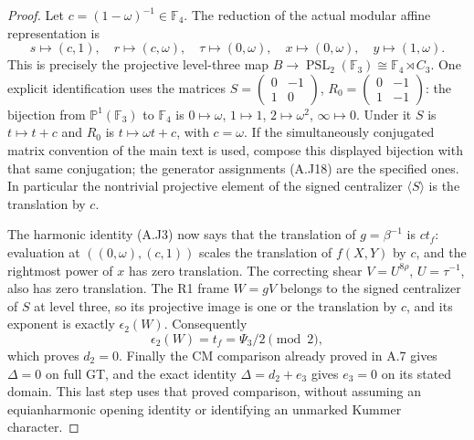 \begin{proof}
Let $c=(1-\omega)^{-1}\in\mathbb F_4$.  The reduction of
the actual modular affine representation is
\[
 s\mapsto(c,1),\quad r\mapsto(c,\omega),\quad
 \tau\mapsto(0,\omega),\quad
 x\mapsto(0,\omega),\quad y\mapsto(1,\omega).
 \tag{A.J18}
\]
This is precisely the projective level-three map
$B\to\operatorname{PSL}_2(\mathbb F_3)
\cong\mathbb F_4\rtimes C_3$.  One explicit identification
uses the matrices
$S=\left(\begin{smallmatrix}0&-1\\1&0\end{smallmatrix}\right)$,
$R_0=\left(\begin{smallmatrix}0&-1\\1&-1\end{smallmatrix}\right)$:
the bijection from $\mathbb P^1(\mathbb F_3)$ to $\mathbb F_4$
is $0\mapsto\omega$, $1\mapsto1$, $2\mapsto\omega^2$,
$\infty\mapsto0$.  Under it $S$ is $t\mapsto t+c$ and
$R_0$ is $t\mapsto\omega t+c$, with $c=\omega$.
If the simultaneously conjugated matrix convention of the
main text is used, compose this displayed bijection with that
same conjugation; the generator assignments (A.J18) are the
specified ones.  In particular the nontrivial projective
element of the signed centralizer $\langle S\rangle$ is the
translation by $c$.

The harmonic identity (A.J3) now says that the translation
of $g=\beta^{-1}$ is $ct_f$: evaluation at
$((0,\omega),(c,1))$ scales the translation of $f(X,Y)$ by
$c$, and the rightmost power of $x$ has zero translation.
The correcting shear $V=U^{8\rho}$, $U=\tau^{-1}$, also has
zero translation.  The R1 frame $W=gV$ belongs to the signed
centralizer of $S$ at level three, so its projective image is
one or the translation by $c$, and its exponent is exactly
$\epsilon_2(W)$.  Consequently
\[
       \epsilon_2(W)=t_f=\Psi_3/2\pmod2,                \tag{A.J19}
\]
which proves $d_2=0$.  Finally the CM comparison already proved
in A.7 gives $\Delta=0$ on full GT, and the exact identity
$\Delta=d_2+e_3$ gives $e_3=0$ on its stated domain.  This last
step uses that proved comparison, without assuming an
equianharmonic opening identity or identifying an unmarked
Kummer character.
\end{proof}
